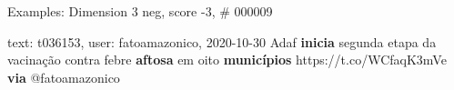 \begin{frame}{Examples: Dimension 3 neg, score -3, \# 000009}
\footnotesize
\begin{alertblock}{text: t036153, user: fatoamazonico, 2020-10-30}
Adaf \textbf{inicia} segunda etapa da vacinação contra febre \textbf{aftosa} em 
oito \textbf{municípios} https://t.co/WCfaqK3mVe \textbf{via} @fatoamazonico 
\end{alertblock}
\end{frame}
